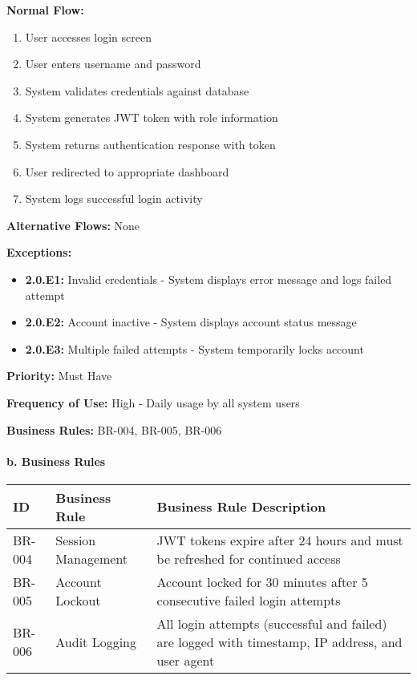 \documentclass[12pt,a4paper]{article}
\begin{document}
\textbf{Normal Flow:}
\begin{enumerate}
    \item User accesses login screen
    \item User enters username and password
    \item System validates credentials against database
    \item System generates JWT token with role information
    \item System returns authentication response with token
    \item User redirected to appropriate dashboard
    \item System logs successful login activity
\end{enumerate}

\textbf{Alternative Flows:} None

\textbf{Exceptions:}
\begin{itemize}
    \item \textbf{2.0.E1:} Invalid credentials - System displays error message and logs failed attempt
    \item \textbf{2.0.E2:} Account inactive - System displays account status message
    \item \textbf{2.0.E3:} Multiple failed attempts - System temporarily locks account
\end{itemize}

\textbf{Priority:} Must Have

\textbf{Frequency of Use:} High - Daily usage by all system users

\textbf{Business Rules:} BR-004, BR-005, BR-006

\paragraph{b. Business Rules}

\begin{longtable}{|p{2cm}|p{4cm}|p{8cm}|}
\hline
\textbf{ID} & \textbf{Business Rule} & \textbf{Business Rule Description} \\
\hline
BR-004 & Session Management & JWT tokens expire after 24 hours and must be refreshed for continued access \\
\hline
BR-005 & Account Lockout & Account locked for 30 minutes after 5 consecutive failed login attempts \\
\hline
BR-006 & Audit Logging & All login attempts (successful and failed) are logged with timestamp, IP address, and user agent \\
\hline
\end{longtable}
\end{document}

